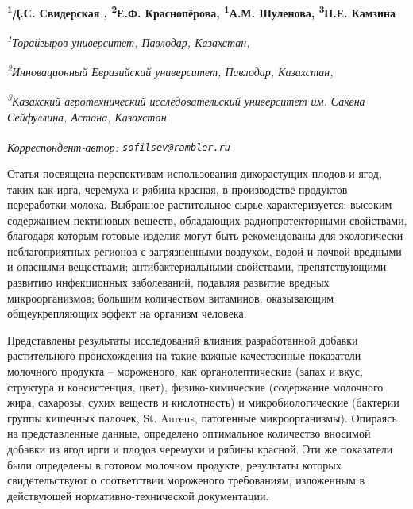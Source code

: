 
\begin{articleheader}

{\bfseries
\textsuperscript{1}Д.С. Свидерская\textsuperscript{\envelope } \authorid,
\textsuperscript{2}Е.Ф. Краснопёрова\authorid,
\textsuperscript{1}А.М. Шуленова\authorid,
\textsuperscript{3}Н.Е. Камзина\authorid}
\end{articleheader}

\begin{affiliation}
\emph{\textsuperscript{1}Торайгыров университет, Павлодар, Казахстан,}

\emph{\textsuperscript{2}Инновационный Евразийский университет, Павлодар, Казахстан,}

\emph{\textsuperscript{3}Казахский агротехнический исследовательский университет им. Сакена Сейфуллина, Астана, Казахстан}

\raggedright \textsuperscript{\envelope }{\em Корреспондент-автор: \href{mailto:sofilsev@rambler.ru}{\nolinkurl{sofilsev@rambler.ru}}}
\end{affiliation}

Статья посвящена перспективам использования дикорастущих плодов и ягод,
таких как ирга, черемуха и рябина красная, в производстве продуктов
переработки молока. Выбранное растительное сырье характеризуется:
высоким содержанием пектиновых веществ, обладающих радиопротекторными
свойствами, благодаря которым готовые изделия могут быть рекомендованы
для экологически неблагоприятных регионов с загрязненными воздухом,
водой и почвой вредными и опасными веществами; антибактериальными
свойствами, препятствующими развитию инфекционных заболеваний, подавляя
развитие вредных микроорганизмов; большим количеством витаминов,
оказывающим общеукрепляющих эффект на организм человека.

Представлены результаты исследований влияния разработанной добавки
растительного происхождения на такие важные качественные показатели
молочного продукта -- мороженого, как органолептические (запах и вкус,
структура и консистенция, цвет), физико-химические (содержание молочного
жира, сахарозы, сухих веществ и кислотность) и микробиологические
(бактерии группы кишечных палочек, St. Aureus, патогенные
микроорганизмы). Опираясь на представленные данные, определено
оптимальное количество вносимой добавки из ягод ирги и плодов черемухи и
рябины красной. Эти же показатели были определены в готовом молочном
продукте, результаты которых свидетельствуют о соответствии мороженого
требованиям, изложенным в действующей нормативно-технической
документации.

